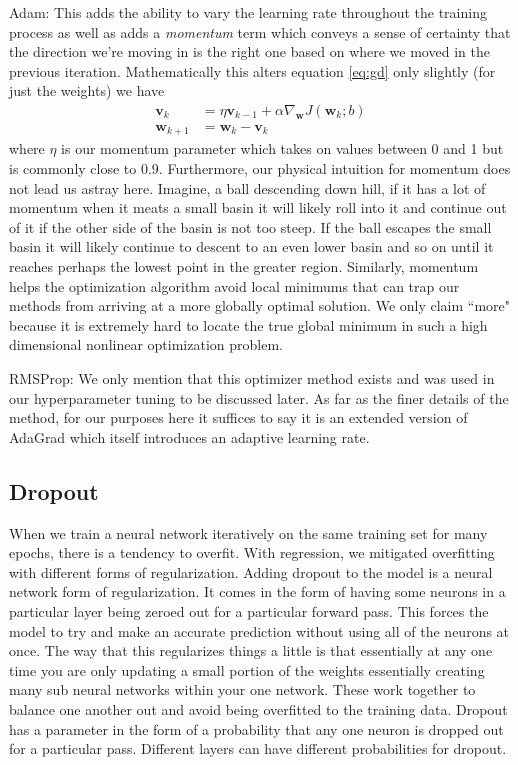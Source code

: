 \documentclass[11pt]{amsart}
\begin{document}
Adam: 
This adds the ability to vary the learning rate throughout the training process as well as adds a \textit{momentum} term which conveys a sense of certainty that the direction we're moving in is the right one based on where we moved in the previous iteration.
Mathematically this alters equation \eqref{eq:gd} only slightly (for just the weights) we have
\begin{equation}
\begin{split}
\bm v_k &= \eta \bm v_{k-1}  + \alpha \nabla_{\bm w} J(\bm w_{k}; b) \\
\bm w_{k + 1} &= \bm w_{k} - \bm v_k
\end{split}
\end{equation}
where $\eta$ is our momentum parameter which takes on values between 0 and 1 but is commonly close to $0.9$.
Furthermore, our physical intuition for momentum does not lead us astray here.
Imagine, a ball descending down hill, if it has a lot of momentum when it meats a small basin it will likely roll into it and continue out of it if the other side of the basin is not too steep.
If the ball escapes the small basin it will likely continue to descent to an even lower basin and so on until it reaches perhaps the lowest point in the greater region.
Similarly, momentum helps the optimization algorithm avoid local minimums that can trap our methods from arriving at a more globally optimal solution.
We only claim ``more" because it is extremely hard to locate the true global minimum in such a high dimensional nonlinear optimization problem.

RMSProp:
We only mention that this optimizer method exists and was used in our hyperparameter tuning to be discussed later.
As far as the finer details of the method, for our purposes here it suffices to say it is an extended version of AdaGrad which itself introduces an adaptive learning rate.

\subsection{Dropout}
When we train a neural network iteratively on the same training set for many epochs, there is a tendency to overfit.
With regression, we mitigated overfitting with different forms of regularization.
Adding dropout to the model is a neural network form of regularization.
It comes in the form of having some neurons in a particular layer being zeroed out for a particular forward pass.
This forces the model to try and make an accurate prediction without using all of the neurons at once.
The way that this regularizes things a little is that essentially at any one time you are only updating a small portion of the weights essentially creating many sub neural networks within your one network.
These work together to balance one another out and avoid being overfitted to the training data.
Dropout has a parameter in the form of a probability that any one neuron is dropped out for a particular pass.
Different layers can have different probabilities for dropout.
\end{document}
